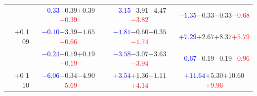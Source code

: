 \documentclass[compress]{beamer}
\begin{document}
\begin{frame}
\begin{tabular}{r | c | c | c}
          & \textcolor{blue}{$-0.33$}\hspace{0.1 cm}$+0.39$\hspace{0.1 cm}$+0.39$\hspace{0.1 cm}\textcolor{red}{$+0.39$} & \textcolor{blue}{$-3.15$}\hspace{0.1 cm}$-3.91$\hspace{0.1 cm}$-4.47$\hspace{0.1 cm}\textcolor{red}{$-3.82$} & \textcolor{blue}{$-1.35$}\hspace{0.1 cm}$-0.33$\hspace{0.1 cm}$-0.33$\hspace{0.1 cm}\textcolor{red}{$-0.68$} \\
$+$0 1 09 & \textcolor{blue}{$-0.10$}\hspace{0.1 cm}$-3.39$\hspace{0.1 cm}$-1.65$\hspace{0.1 cm}\textcolor{red}{$+0.66$} & \textcolor{blue}{$-1.81$}\hspace{0.1 cm}$-0.60$\hspace{0.1 cm}$-0.35$\hspace{0.1 cm}\textcolor{red}{$-1.74$} & \textcolor{blue}{$+7.29$}\hspace{0.1 cm}$+2.67$\hspace{0.1 cm}$+8.37$\hspace{0.1 cm}\textcolor{red}{$+5.79$} \\
          & \textcolor{blue}{$-0.24$}\hspace{0.1 cm}$+0.19$\hspace{0.1 cm}$+0.19$\hspace{0.1 cm}\textcolor{red}{$+0.19$} & \textcolor{blue}{$-3.58$}\hspace{0.1 cm}$-3.07$\hspace{0.1 cm}$-3.63$\hspace{0.1 cm}\textcolor{red}{$-3.94$} & \textcolor{blue}{$-0.67$}\hspace{0.1 cm}$-0.19$\hspace{0.1 cm}$-0.19$\hspace{0.1 cm}\textcolor{red}{$-0.96$} \\
$+$0 1 10 & \textcolor{blue}{$-6.06$}\hspace{0.1 cm}$-0.34$\hspace{0.1 cm}$-4.90$\hspace{0.1 cm}\textcolor{red}{$-5.69$} & \textcolor{blue}{$+3.54$}\hspace{0.1 cm}$+1.36$\hspace{0.1 cm}$+1.11$\hspace{0.1 cm}\textcolor{red}{$+4.14$} & \textcolor{blue}{$+11.64$}\hspace{0.1 cm}$+5.30$\hspace{0.1 cm}$+10.60$\hspace{0.1 cm}\textcolor{red}{$+9.96$} \\

\end{tabular}
\end{frame}
\end{document}
